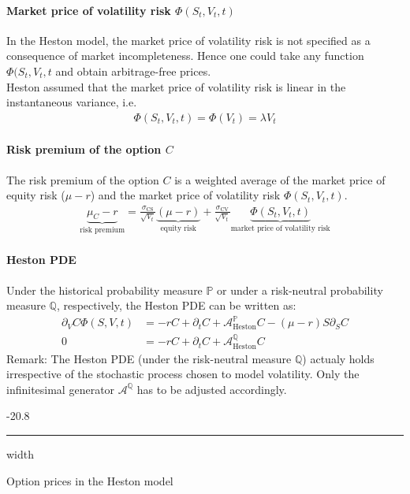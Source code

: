 \documentclass[a4paper,landscape,7pt,fleqn]{scrartcl}
\makeatletter
\renewcommand{\subsubsection}{\@startsection{subsubsection}{1}{0mm}%
{-2\baselineskip}{0.8\baselineskip}%
{\hrule depth 0.2pt width\columnwidth\vspace*{1.2em}\normalsize\bfseries}}
\makeatother
\begin{document}
\begin{multicols*}{3}
\paragraph{Market price of volatility risk $\Phi(S_t,V_t,t)$}
In the Heston model, the market price of volatility risk is not specified as a consequence of market incompleteness. Hence one could take any function $\Phi(S_t,V_t,t$ and obtain arbitrage-free prices. \\
Heston assumed that the market price of volatility risk is linear in the instantaneous variance, i.e.
\begin{align*}
\Phi (S_t, V_t,t) = \Phi (V_t) = \lambda V_t
\end{align*}

\paragraph{Risk premium of the option $C$}
The risk premium of the option $C$ is a weighted average of the market price of equity risk ($\mu-r$) and the market price of volatility risk $\Phi(S_t,V_t,t)$.
\begin{align*}
\underbrace{\mu_C - r}\limits_\text{risk premium} = \frac{\sigma_\text{CS}}{\sqrt{V_t}} \underbrace{(\mu-r)}\limits_\text{equity risk} + \frac{\sigma_\text{CV}}{\sqrt{V_t}} \underbrace{\Phi(S_t,V_t,t)}\limits_\text{market price of volatility risk}
\end{align*}

\paragraph{Heston PDE}
Under the historical probability measure $\mathbb{P}$ or under a risk-neutral probability measure $\mathbb{Q}$, respectively, the Heston PDE can be written as:
\begin{align*}
\partial_V C \Phi(S,V,t) &= -r C + \partial_t C + \mathcal{A}_\text{Heston}^\mathbb{P} C - (\mu - r) S \partial_S C \\
0 &=-r C + \partial_t C + \mathcal{A}_\text{Heston}^\mathbb{Q} C
\end{align*}
Remark: The Heston PDE (under the risk-neutral measure $\mathbb{Q}$) actualy holds irrespective of the stochastic process chosen to model volatility. Only the infinitesimal generator $\mathcal{A}^\mathbb{Q}$ has to be adjusted accordingly.

\subsubsection{Option prices in the Heston model}


\end{multicols*}
\end{document}
